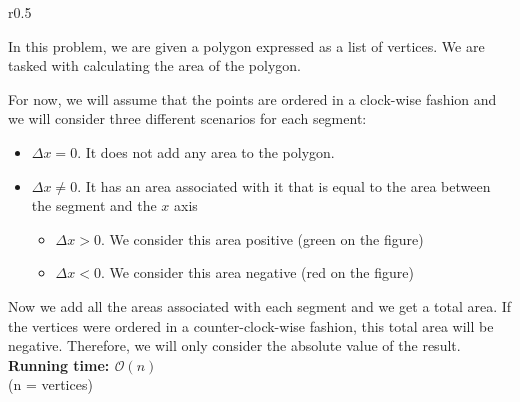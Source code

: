 \documentclass[12pt]{report}
\begin{document}
\begin{wrapfigure}{r}{0.5\linewidth}
	\centering
	\vspace*{-40 pt}
\end{wrapfigure}

In this problem, we are given a polygon expressed as a list of vertices.
We are tasked with calculating the area of the polygon.

For now, we will assume that the points are ordered in a clock-wise fashion
and we will consider three different scenarios for each segment:
\begin{itemize}
	\item $\Delta x=0$. It does not add any area to the polygon.
	\item $\Delta x\ne 0$. It has an area associated with it that is equal
		to the area between the segment and the $x$ axis
		\begin{itemize}
			\item $\Delta x > 0$. We consider this area positive
				(green on the figure)
			\item $\Delta x < 0$. We consider this area negative
				(red on the figure)
		\end{itemize}
\end{itemize}

Now we add all the areas associated with each segment and we get a total area.
If the vertices were ordered in a counter-clock-wise fashion, this total
area will be negative. Therefore, we will only consider the absolute
value of the result.
\noindent \textbf{\boldmath Running time: $\mathcal{O}(n)$}
\\ {\small (n = vertices)}
\end{document}
